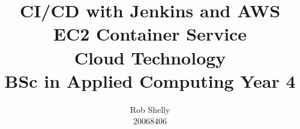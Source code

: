 \documentclass[a4paper]{article}
\title{CI/CD with Jenkins and AWS EC2 Container Service \\ \small{Cloud Technology \\ BSc in Applied Computing Year 4}}
\author{Rob Shelly \\ \small{20068406}}
\begin{document}
\maketitle
\thispagestyle{empty} %

\newpage
{}
\tableofcontents

\newpage
{}






\newpage
\renewcommand*{\bibfont}{\raggedright}



\begin{appendices}
	
	
\end{appendices}
\end{document}
